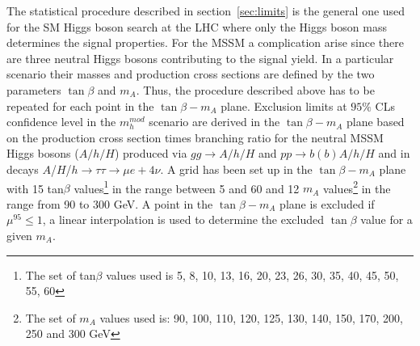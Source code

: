 The statistical procedure described in section~\ref{sec:limits} is  the general one used for the SM Higgs
boson search at the LHC where only the Higgs boson mass determines the signal properties. For the MSSM a complication
arise since  there are three neutral Higgs bosons contributing to the signal yield.
In a particular scenario their masses and production cross sections are defined 
by the two parameters $\tan \beta$ and $m_A$. Thus, the  procedure described above
 has to be repeated for each point in the $\tan \beta - m_A$ plane. 
Exclusion limits at $95\%$ CLs confidence level in the $m_h^{mod}$ scenario  
are derived in the $\tan \beta - m_A$ plane based on the production cross section times branching ratio for
the neutral MSSM Higgs bosons ($A/h/H$) produced via $gg\rightarrow A/h/H$ and $pp\rightarrow b(b)A/h/H$
 and in decays $A$/$H$/$h\to\tau\tau\to \mu e + 4\nu$. 
A grid has been set up in the $\tan \beta - m_A$ plane with 15 tan$\beta$ values\footnote{
			The set of  tan$\beta$ values used
			is 5, 8, 10, 13, 16, 20, 23, 26, 30, 35, 40, 45, 50, 55, 60}  
in the range between 5 and 60 and 12 $m_A$ values\footnote{ The set of $m_A$ values used is: 90, 100, 110, 120, 125, 130,
                        140, 150, 170, 200, 250 and 300 GeV}
in the range from 90 to 300 GeV. A point in the  $\tan \beta - m_A$ plane is excluded if $\mu^{95} \leq 1$,
a linear interpolation is used to determine the excluded $\tan \beta$ value for a given $m_A$.





